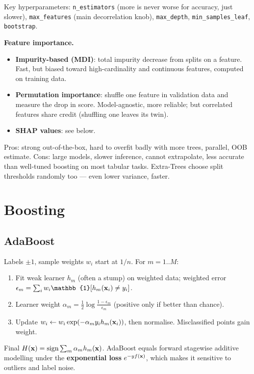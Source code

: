 Key hyperparameters: \texttt{n\_estimators} (more is never worse for accuracy, just slower), \texttt{max\_features} (main decorrelation knob), \texttt{max\_depth}, \texttt{min\_samples\_leaf}, \texttt{bootstrap}.

\textbf{Feature importance.}
\begin{itemize}
  \item \textbf{Impurity-based (MDI)}: total impurity decrease from splits on a feature. Fast, but biased toward high-cardinality and continuous features, computed on training data.
  \item \textbf{Permutation importance}: shuffle one feature in validation data and measure the drop in score. Model-agnostic, more reliable; but correlated features share credit (shuffling one leaves its twin).
  \item \textbf{SHAP values}: see below.
\end{itemize}

Pros: strong out-of-the-box, hard to overfit badly with more trees, parallel, OOB estimate. Cons: large models, slower inference, cannot extrapolate, less accurate than well-tuned boosting on most tabular tasks. Extra-Trees choose split thresholds randomly too --- even lower variance, faster.

\section{Boosting}

\subsection{AdaBoost}
Labels $\pm1$, sample weights $w_i$ start at $1/n$. For $m=1..M$:
\begin{enumerate}
  \item Fit weak learner $h_m$ (often a stump) on weighted data; weighted error $\epsilon_m=\sum_iw_i\mathbb{1}[h_m(\x_i)\ne y_i]$.
  \item Learner weight $\alpha_m=\frac12\log\frac{1-\epsilon_m}{\epsilon_m}$ (positive only if better than chance).
  \item Update $w_i\leftarrow w_i\exp(-\alpha_my_ih_m(\mathbf{x}_i))$, then normalise. Misclassified points gain weight.
\end{enumerate}
Final $H(\mathbf{x})=\operatorname{sign}\sum_m\alpha_mh_m(\mathbf{x})$. AdaBoost equals forward stagewise additive modelling under the \textbf{exponential loss} $e^{-yf(\mathbf{x})}$, which makes it sensitive to outliers and label noise.

